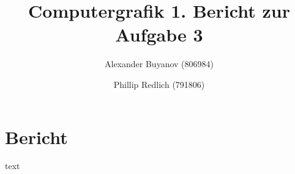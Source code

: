 \documentclass[12pt]{amsart}
\title{Computergrafik 1. Bericht zur Aufgabe 3}
\author{Alexander Buyanov (806984)}
\author{Phillip Redlich (791806)}
\begin{document}
\maketitle

\section{Bericht}

text
\end{document}
